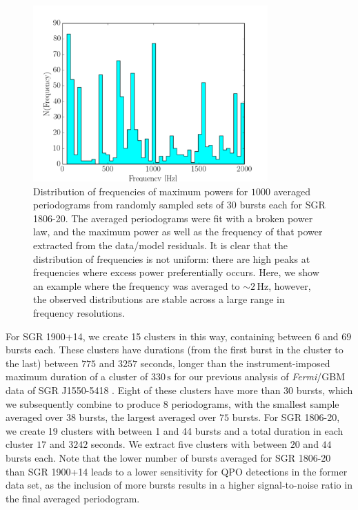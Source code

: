 \documentclass[numberedappendix]{emulateapj}
\newcommand{\hz}{\,\mathrm{Hz}}
\newcommand{\project}[1]{\textsl{#1}}
\newcommand{\fermi}{\project{Fermi}}
\begin{document}
\begin{figure}[htbp]
\begin{center}
\includegraphics[width=9cm]{f4.pdf}
\caption{Distribution of frequencies of maximum powers for $1000$ averaged periodograms from randomly sampled sets of $30$ bursts each for SGR 1806-20. The averaged periodograms were fit with a broken power law, and the maximum power as well as the frequency of that power extracted from the data/model residuals. It is clear that the distribution of frequencies is not uniform: there are high peaks at frequencies where excess power preferentially occurs.  Here, we show an example where the frequency was averaged to $\sim 2 \hz$, however, the observed distributions are stable across a large range in frequency resolutions.}
\label{fig:psd_avg_freqdist}
\end{center}
\end{figure}
For SGR 1900+14, we create 15 clusters in this way, containing between $6$ and $69$ bursts each. These clusters have durations (from the first burst in the cluster to the last) between $775$ and $3257$ seconds, longer than the instrument-imposed maximum duration of a cluster of $330 \, \mathrm{s}$ for our previous analysis of \fermi/GBM data of SGR J1550-5418 \citep{huppenkothen2014}. Eight of these clusters have more than $30$ bursts, which we subsequently combine to produce 8 periodograms, with the smallest sample averaged over $38$ bursts, the largest averaged over $75$ bursts.
For SGR 1806-20, we create 19 clusters with between 1 and 44 bursts and a total duration in each cluster $17$ and $3242$ seconds. We extract five clusters with between $20$ and $44$ bursts each. Note that the lower number of bursts averaged for SGR 1806-20 than SGR 1900+14 leads to a lower sensitivity for QPO detections in the former data set, as the inclusion of more bursts results in a higher signal-to-noise ratio in the final averaged periodogram.
\end{document}
